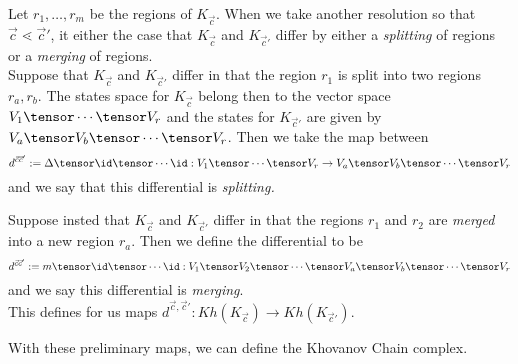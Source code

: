 \begin{definition}
Let $r_1, \ldots, r_m$ be the regions of $K_{\vec c}.$ When we take another resolution so that  $\vec c\lessdot \vec c'$, it either the case that $K_{\vec{c}}$ and $K_{\vec c'}$ differ by either a \emph{splitting} of regions or a \emph{merging} of regions.   \\
Suppose that $K_{\vec c}$ and $K_{\vec c'}$ differ in that the region $r_1$ is split into two regions $r_a, r_b$. The states space for $K_{\vec c}$ belong then to the vector space $V_1\tensor \cdots\tensor  V_r$ and the states for $K_{\vec c'}$ are given by $V_a\tensor V_b\tensor \cdots\tensor V_r$. Then we take the map between \[d^{\vec c \vec c'}:=\Delta\tensor\id\tensor \cdots \id: V_1\tensor \cdots\tensor  V_r\to V_a\tensor V_b\tensor \cdots\tensor V_r\]
and we say that this differential is \emph{splitting.}\\
\noindent{}

 Suppose insted that $K_{\vec c}$ and $K_{\vec c'}$ differ in that the regions $r_1$ and $r_2$ are \emph{merged} into a new region $r_a$. Then we define the differential to be 
\[d^{\vec c \vec c'}:= m\tensor\id\tensor \cdots \id: V_1\tensor V_2\tensor \cdots\tensor   V_a\tensor V_b\tensor \cdots\tensor V_r\]
and we say this differential is \emph{merging}.\\
\noindent{}
This defines for us maps $d^{\vec c, \vec c'}: Kh(K_{\vec c})\to Kh(K_{\vec c'}).$
\end{definition}
With these preliminary maps, we can define the Khovanov Chain complex.

